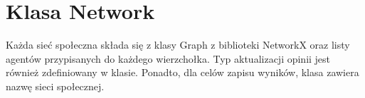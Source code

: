 \section{Klasa Network}

Każda sieć społeczna składa się z klasy Graph z biblioteki NetworkX \cite{NetworkX} oraz listy agentów przypisanych do każdego wierzchołka.
Typ aktualizacji opinii jest również zdefiniowany w klasie.
Ponadto, dla celów zapisu wyników, klasa zawiera nazwę sieci społecznej.